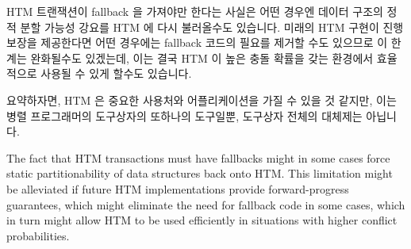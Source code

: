 \iffalse

Use of locking in conjunction with HTM seems likely to overcome HTM's
difficulties with irrevocable operations, while use of RCU or
hazard pointers might alleviate HTM's transaction-size limitations
for read-only operations that traverse large fractions of the data
structure~\cite{SeongJaePark2020HTMRCUlock}.
Current HTM implementations unconditionally abort an update transaction
that conflicts with an RCU or hazard-pointer reader, but perhaps future
HTM implementations will interoperate more smoothly with these
synchronization mechanisms.
In the meantime, the probability of an update conflicting with a
large RCU or hazard-pointer read-side critical section should be
much smaller than the probability of conflicting with the equivalent
read-only transaction.\footnote{
	It is quite ironic that strictly transactional mechanisms are
	appearing in shared-memory systems at just about the time
	that NoSQL databases are relaxing the traditional
	database-application reliance on strict transactions.
	Nevertheless, HTM has in fact realized the ease-of-use promise
	of TM, albeit for black-hat attacks on the Linux kernel's
	address-space randomization defense
	mechanism~\cite{YeongjinJang2016TSXbreakKASLR,Jang:2016:BKA:2976749.2978321}.}
Nevertheless, it is quite possible that a steady stream of RCU or
hazard-pointer readers might starve updaters due to a corresponding
steady stream of conflicts.
This vulnerability could be eliminated (at significant
hardware cost and complexity) by giving extra-transactional
reads the pre-transaction copy of the memory location being loaded.

\fi

HTM 트랜잭션이 fallback 을 가져야만 한다는 사실은 어떤 경우엔 데이터 구조의
정적 분할 가능성 강요를 HTM 에 다시 불러올수도 있습니다.
미래의 HTM 구현이 진행 보장을 제공한다면 어떤 경우에는 fallback
코드의 필요를 제거할 수도 있으므로 이 한계는 완화될수도 있겠는데, 이는 결국 HTM
이 높은 충돌 확률을 갖는 환경에서 효율적으로 사용될 수 있게 할수도 있습니다.

요약하자면, HTM 은 중요한 사용처와 어플리케이션을 가질 수 있을 것 같지만, 이는
병렬 프로그래머의 도구상자의 또하나의 도구일뿐, 도구상자 전체의 대체제는
아닙니다.

\iffalse

The fact that HTM transactions must have fallbacks might in some cases
force static partitionability of data structures back onto HTM\@.
This limitation might be alleviated if future HTM implementations
provide forward-progress guarantees, which might eliminate the need
for fallback code in some cases, which in turn might allow HTM to
be used efficiently in situations with higher conflict probabilities.

